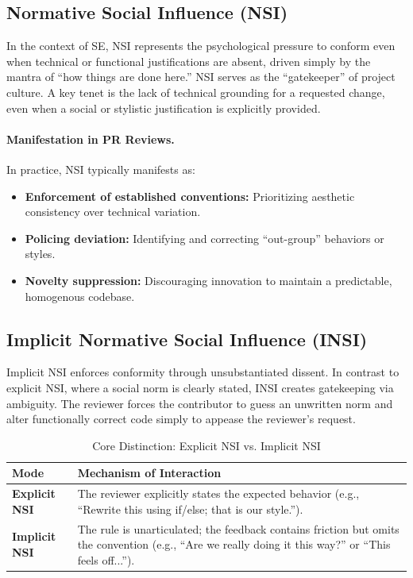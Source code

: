 \documentclass[10pt]{article}
\begin{document}
\subsection{Normative Social Influence (NSI)}
In the context of SE, NSI represents the psychological pressure to conform even when technical or functional justifications are absent, driven simply by the mantra of ``how things are done here.'' NSI serves as the ``gatekeeper'' of project culture. A key tenet is the lack of technical grounding for a requested change, even when a social or stylistic justification is explicitly provided.

\paragraph{Manifestation in PR Reviews.} In practice, NSI typically manifests as:
\begin{itemize}
    \item \textbf{Enforcement of established conventions:} Prioritizing aesthetic consistency over technical variation.
    \item \textbf{Policing deviation:} Identifying and correcting ``out-group'' behaviors or styles.
    \item \textbf{Novelty suppression:} Discouraging innovation to maintain a predictable, homogenous codebase.
\end{itemize}

\subsection{Implicit Normative Social Influence (INSI)}
Implicit NSI enforces conformity through unsubstantiated dissent. In contrast to explicit NSI, where a social norm is clearly stated, INSI creates gatekeeping via ambiguity. The reviewer forces the contributor to guess an unwritten norm and alter functionally correct code simply to appease the reviewer's request.

\begin{table}[ht]
\centering
\caption{Core Distinction: Explicit NSI vs. Implicit NSI}
\label{tab:nsi_distinction}
\begin{tabular}{@{}p{}p{}@{}}
\toprule
\textbf{Mode} & \textbf{Mechanism of Interaction} \\ \midrule
\textbf{Explicit NSI} & The reviewer explicitly states the expected behavior (e.g., ``Rewrite this using if/else; that is our style.''). \\
\textbf{Implicit NSI} & The rule is unarticulated; the feedback contains friction but omits the convention (e.g., ``Are we really doing it this way?'' or ``This feels off...''). \\ \bottomrule
\end{tabular}
\end{table}
\end{document}
